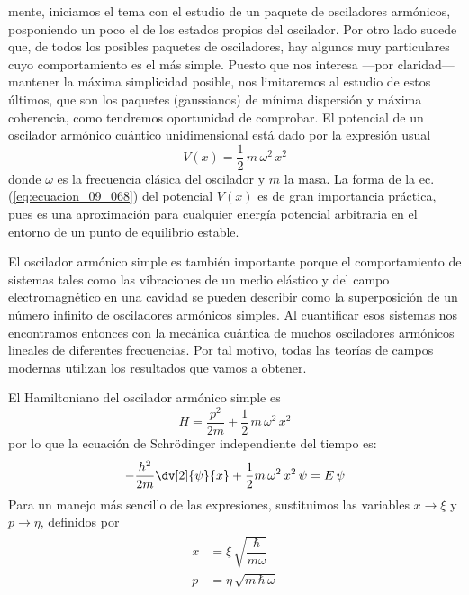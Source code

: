 mente, iniciamos el tema con el estudio de un paquete de osciladores armónicos,
posponiendo un poco el de los estados propios del oscilador. Por otro lado sucede
que, de todos los posibles paquetes de osciladores, hay algunos muy particulares
cuyo comportamiento es el más simple. Puesto que nos interesa —por claridad—
mantener la máxima simplicidad posible, nos limitaremos al estudio de estos últimos,
que son los paquetes (gaussianos) de mínima dispersión y máxima coherencia, como
tendremos oportunidad de comprobar.
El potencial de un oscilador armónico cuántico unidimensional está dado por la
expresión usual
\begin{equation}
V(x) = \dfrac{1}{2} \, m  \, \omega^{2} \, x^{2}
\label{eq:ecuacion_09_068}
\end{equation}
donde $\omega$ es la frecuencia clásica del oscilador y $m$ la masa. La forma de la ec. (\ref{eq:ecuacion_09_068}) del potencial $V (x)$ es de gran importancia práctica, pues es una aproximación para cualquier energía potencial arbitraria en el entorno de un punto de equilibrio estable. 
\par
El oscilador armónico simple es también importante porque el comportamiento de sistemas tales como las vibraciones de un medio elástico y del campo electromagnético en una cavidad se pueden describir como la superposición de un número infinito de osciladores armónicos simples. Al cuantificar esos sistemas nos encontramos entonces con la mecánica cuántica de muchos osciladores armónicos lineales de diferentes frecuencias. Por tal motivo, todas las teorías de campos modernas utilizan los resultados que vamos a obtener.
\par
El Hamiltoniano del oscilador armónico simple es
\begin{equation}
H = \dfrac{p^{2}}{2 m} + \dfrac{1}{2} \, m \, \omega^{2} \, x^{2}
\label{eq:ecuacion_09_069}
\end{equation}
por lo que la ecuación de Schrödinger independiente del tiempo es:
\begin{equation}
- \dfrac{h^{2}}{2 m} \dv[2]{\psi}{x} + \dfrac{1}{2} m \, \omega^{2} \, x^{2} \, \psi = E \, \psi
\label{eq:ecuacion_09_070}
\end{equation}
Para un manejo más sencillo de las expresiones, sustituimos las variables $x \to \xi$ y $p \to \eta$, definidos por
\begin{align}
\begin{aligned}
x &= \xi \, \sqrt{\dfrac{\hbar}{m \omega}} \\[1em]
p &= \eta \, \sqrt{m \, \hbar \, \omega}
\end{aligned}
\label{eq:ecuacion_07_071}
\end{align}
